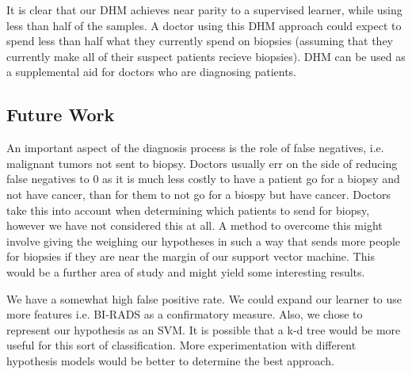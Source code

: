 \documentclass[12pt]{article}
\begin{document}
It is clear that our DHM achieves near parity to a supervised learner, while using less than half of the samples. A doctor using this DHM approach could expect to spend less than half what they currently spend on biopsies (assuming that they currently make all of their suspect patients recieve biopsies). DHM can be used as a supplemental aid for doctors who are diagnosing patients. 

\subsection{Future Work}
An important aspect of the diagnosis process is the role of false negatives, i.e. malignant tumors not sent to biopsy. Doctors usually err on the side of reducing false negatives to 0 as it is much less costly to have a patient go for a biopsy and not have cancer, than for them to not go for a biospy but have cancer. Doctors take this into account when determining which patients to send for biopsy, however we have not considered this at all. A method to overcome this might involve giving the weighing our hypotheses in such a way that sends more people for biopsies if they are near the margin of our support vector machine. This would be a further area of study and might yield some interesting results.

We have a somewhat high false positive rate. We could expand our learner to use more features i.e. BI-RADS as a confirmatory measure. Also, we chose to represent our hypothesis as an SVM. It is possible that a k-d tree would be more useful for this sort of classification. More experimentation with different hypothesis models would be better to determine the best approach.

{}

\end{document}
